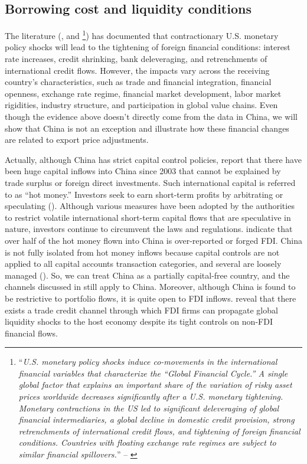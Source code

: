 \subsection{Borrowing cost and liquidity conditions}

The literature (\cite{RePEc:fip:fedkpr:y:2013:x:9}, \cite{georgiadis2016determinants} and \cite{miranda2020us} \footnote{“\textit{U.S. monetary policy shocks induce co-movements in the international financial variables that characterize the “Global Financial Cycle.” A single global factor that explains an important share of the variation of risky asset prices worldwide decreases significantly after a U.S. monetary tightening. Monetary contractions in the US led to significant deleveraging of global financial intermediaries, a global decline in domestic credit provision, strong retrenchments of international credit flows, and tightening of foreign financial conditions. Countries with floating exchange rate regimes are subject to similar financial spillovers.}” -- \cite{miranda2020us}}) has documented that contractionary U.S. monetary policy shocks will lead to the tightening of foreign financial conditions: interest rate increases, credit shrinking, bank deleveraging, and retrenchments of international credit flows. However, the impacts vary across the receiving country's characteristics, such as trade and financial integration, financial openness, exchange rate regime, financial market development, labor market rigidities, industry structure, and participation in global value chains. Even though the evidence above doesn't directly come from the data in China, we will show that China is not an exception and illustrate how these financial changes are related to export price adjustments. 

Actually, although China has strict capital control policies, \cite{prasad2007chinese} report that there have been huge capital inflows into China since 2003 that cannot be explained by trade surplus or foreign direct investments. Such international capital is referred to as “hot money.” Investors seek to earn short-term profits by arbitrating or speculating (\cite{kim2000fear}). Although various measures have been adopted by the authorities to restrict volatile international short-term capital flows that are speculative in nature, investors continue to circumvent the laws and regulations. \cite{martin2019china} indicate that over half of the hot money flown into China is over-reported or forged FDI. China is not fully isolated from hot money inflows because capital controls are not applied to all capital accounts transaction categories, and several are loosely managed (\cite{ping2004china}). So, we can treat China as a partially capital-free country, and the channels discussed in \cite{miranda2020us} still apply to China. Moreover, although China is found to be restrictive to portfolio flows, it is quite open to FDI inflows. \cite{lin2018foreign} reveal that there exists a trade credit channel through which FDI firms can propagate global liquidity shocks to the host economy despite its tight controls on non-FDI financial flows.
 
